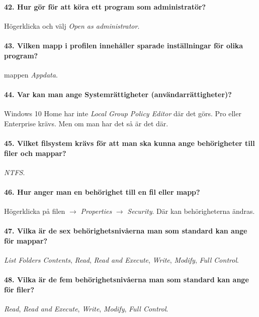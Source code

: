 \paragraph{42. Hur gör för att köra ett program som administratör?}
Högerklicka och välj \textit{Open as administrator}.

\paragraph{43. Vilken mapp i profilen innehåller sparade inställningar för olika program?}
mappen \textit{Appdata}.

\paragraph{44. Var kan man ange Systemrättigheter (användarrättigheter)?}
Windows 10 Home har inte \textit{Local Group Policy Editor} där det görs. Pro eller Enterprise krävs. Men om man har det så är det där.

\paragraph{45. Vilket filsystem krävs för att man ska kunna ange behörigheter till filer och mappar?}
\textit{NTFS}.

\paragraph{46. Hur anger man en behörighet till en fil eller mapp?} Högerklicka på filen $\rightarrow$ \textit{Properties} $\rightarrow$ \textit{Security}. Där kan behörigheterna ändras.
 
\paragraph{47. Vilka är de sex behörighetsnivåerna man som standard kan ange för mappar?}
\textit{List Folders Contents}, \textit{Read}, \textit{Read and Execute}, \textit{Write}, \textit{Modify}, \textit{Full Control}. 

\paragraph{48. Vilka är de fem behörighetsnivåerna man som standard kan ange för filer?}
\textit{Read}, \textit{Read and Execute}, \textit{Write}, \textit{Modify}, \textit{Full Control}. 















